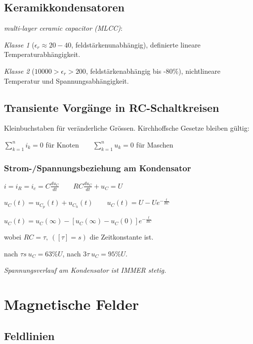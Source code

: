 \documentclass[10pt,a4paper]{scrartcl}
\begin{document}
\begin{multicols*}{3}
	 
	
	\subsection{Keramikkondensatoren}	
	
	\emph{multi-layer ceramic capacitor (MLCC)}:

	\emph{Klasse 1} ($\epsilon_r \approx 20-40$, feldstärkenunabhängig), definierte lineare Temperaturabhängigkeit.
	
	\emph{Klasse 2} ($10000>\epsilon_r > 200$, feldstärkenabhängig bis -80\%), nichtlineare Temperatur und Spannungsabhängigkeit.
		
	\columnbreak 
	
	\subsection{Transiente Vorgänge in RC-Schaltkreisen}
	
	
	\dahe Kleinbuchstaben für veränderliche Grössen. Kirchhoffsche Gesetze bleiben gültig: 
	
	$\sum_{k=1}^n{i_k=0}$ für Knoten$\qquad\sum_{k=1}^n{u_k=0}$ für Maschen	
	
	\subsubsection{Strom-/Spannungsbeziehung am Kondensator}
	
	$i=i_R=i_c=C\frac{du_C}{dt}\qquad RC\frac{du_C}{dt}+u_C=U$
	
	\finn	
	
	$u_C(t)=u_{C_p}(t)+u_{C_h}(t)\qquad u_C(t)=U-Ue^{-\frac{t}{RC}}$
	
	$ u_C(t)=u_C(\infty)-[u_C(\infty)-u_C(0)]e^{-\frac{t}{RC}}$
	
	wobei $RC=\tau,\ ([\tau]=s)$ die Zeitkonstante ist.
	
	nach $\tau s\ u_C=63\%U$, nach $3\tau\ u_C=95\%U$.
	
	\emph{Spannungsverlauf am Kondensator ist IMMER stetig.}
	
	 
	
	\section{Magnetische Felder}
	
	\subsection{Feldlinien}
	

\end{multicols*}
\end{document}
